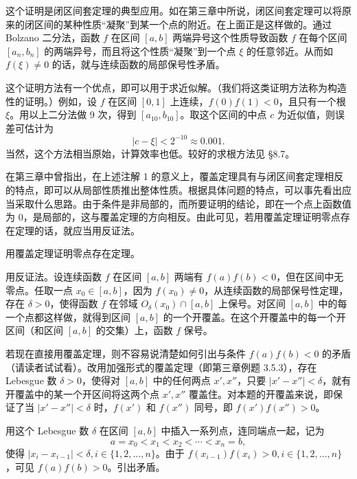 \begin{xremark}
这个证明是闭区间套定理的典型应用。如在第三章中所说，闭区间套定理可以将原来的闭区间的某种性质“凝聚”到某一个点的附近。在上面正是这样做的。通过 Bolzano 二分法，函数 $f$ 在区间 $[a,b]$ 两端异号这个性质导致函数 $f$ 在每个区间 $[a_n,b_n]$ 的两端异号，而且将这个性质“凝聚”到一个点 $\xi$ 的任意邻近。从而如 $f(\xi)\ne0$ 的话，就与连续函数的局部保号性矛盾。
\end{xremark}

\begin{xremark}
这个证明方法有一个优点，即可以用于求近似解。（我们将这类证明方法称为构造性的证明。）例如，设 $f$ 在区间 $[0,1]$ 上连续，$f(0)f(1)<0$，且只有一个根 $\xi$。用以上二分法做 9 次，得到 $[a_{10},b_{10}]$。取这个区间的中点 $c$ 为近似值，则误差可估计为
\[
  |c-\xi|<2^{-10}\approx0.001.
\]
当然，这个方法相当原始，计算效率也低。较好的求根方法见 §8.7。
\end{xremark}

在第三章中曾指出，在上述注解 1 的意义上，覆盖定理具有与闭区间套定理相反的特点，即可以从局部性质推出整体性质。根据具体问题的特点，可以事先看出应当采取什么思路。由于条件是非局部的，而所要证明的结论，即在一个点上函数值为 0，是局部的，这与覆盖定理的方向相反。由此可见，若用覆盖定理证明零点存在定理的话，就应当用反证法。

\begin{xexample}[5.2.2]
用覆盖定理证明零点存在定理。
\end{xexample}
\begin{xproof}
用反证法。设连续函数 $f$ 在区间 $[a,b]$ 两端有 $f(a)f(b)<0$，但在区间中无零点。任取一点 $x_0\in[a,b]$，因为 $f(x_0)\ne0$，从连续函数的局部保号性定理，存在 $\delta>0$，使得函数 $f$ 在邻域 $O_\delta(x_0)\cap[a,b]$ 上保号。对区间 $[a,b]$ 中的每一个点都这样做，就得到区间 $[a,b]$ 的一个开覆盖。在这个开覆盖中的每一个开区间（和区间 $[a,b]$ 的交集）上，函数 $f$ 保号。

若现在直接用覆盖定理，则不容易说清楚如何引出与条件 $f(a)f(b)<0$ 的矛盾（请读者试试看）。改用加强形式的覆盖定理（即第三章例题 3.5.3），存在 Lebesgue 数 $\delta>0$，使得对 $[a,b]$ 中的任何两点 $x',x''$，只要 $|x'-x''|<\delta$，就有开覆盖中的某一个开区间将这两个点 $x',x''$ 覆盖住。对本题的开覆盖来说，即保证了当 $|x'-x''|<\delta$ 时，$f(x')$ 和 $f(x'')$ 同号，即 $f(x')f(x'')>0$。

用这个 Lebesgue 数 $\delta$ 在区间 $[a,b]$ 中插入一系列点，连同端点一起，记为
\[
  a=x_0<x_1<x_2<\cdots<x_n=b,
\]
使得 $|x_i-x_{i-1}|<\delta,i\in\{1,2,\ldots,n\}$。由于 $f(x_{i-1})f(x_i)>0,i\in\{1,2,\ldots,n\}$，可见 $f(a)f(b)>0$。引出矛盾。
\end{xproof}

